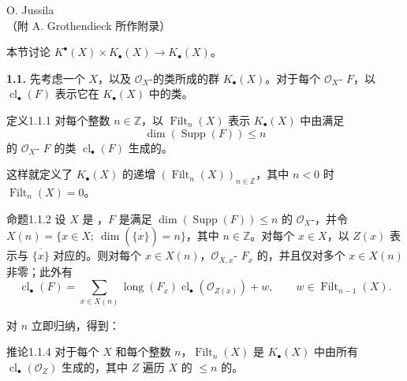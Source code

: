 \begin{center}O. Jussila\\（附 A. Grothendieck 所作附录）\end{center}
本节讨论 $K^\bullet(X)\times K_\bullet(X)\longrightarrow K_\bullet(X)$。

\textbf{1.1.} 先考虑一个   $X$，以及 $\mathcal O_X$-的类所成的群 $K_\bullet(X)$。对于每个 $\mathcal O_X$- $F$，以 $\operatorname{cl}_\bullet(F)$ 表示它在 $K_\bullet(X)$ 中的类。
\begin{SGAresult}{定义}{1.1.1}
对每个整数 $n\in\mathbb Z$，以 $\operatorname{Filt}_n(X)$ 表示 $K_\bullet(X)$ 中由满足
\[\dim(\operatorname{Supp}(F))\leq n\]
的 $\mathcal O_X$- $F$ 的类 $\operatorname{cl}_\bullet(F)$ 生成的。
\end{SGAresult}
这样就定义了 $K_\bullet(X)$ 的递增 $(\operatorname{Filt}_n(X))_{n\in\mathbb Z}$，其中 $n<0$ 时 $\operatorname{Filt}_n(X)=0$。
\begin{SGAresult}{命题}{1.1.2}
设 $X$ 是  ，$F$ 是满足 $\dim(\operatorname{Supp}(F))\leq n$ 的 $\mathcal O_X$-，并令 $X(n)=\{x\in X;\ \dim(\overline{\{x\}})=n\}$，其中 $n\in\mathbb Z$。对每个 $x\in X$，以 $Z(x)$ 表示与 $\overline{\{x\}}$ 对应的。则对每个 $x\in X(n)$，$\mathcal O_{X,x}$- $F_x$ 的，并且仅对多个 $x\in X(n)$ 非零；此外有
\[\operatorname{cl}_\bullet(F)=\sum_{x\in X(n)}\operatorname{long}(F_x)\operatorname{cl}_\bullet(\mathcal O_{Z(x)})+w,\qquad w\in\operatorname{Filt}_{n-1}(X).\tag{1.1.3}\]
\end{SGAresult}
对 $n$ 立即归纳，得到：
\begin{SGAresult}{推论}{1.1.4}
对于每个   $X$ 和每个整数 $n$，$\operatorname{Filt}_n(X)$ 是 $K_\bullet(X)$ 中由所有 $\operatorname{cl}_\bullet(\mathcal O_Z)$ 生成的，其中 $Z$ 遍历 $X$ 的 $\leq n$ 的。
\end{SGAresult}

